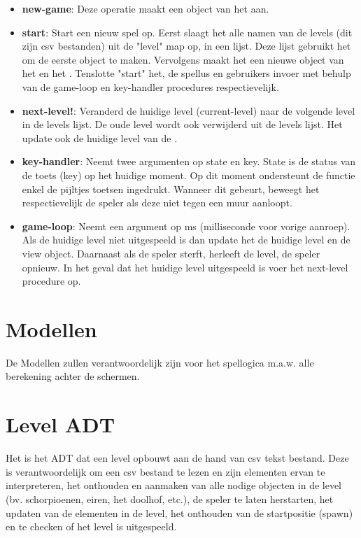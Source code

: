 \begin{itemize}
	\item \textbf{new-game}: Deze operatie maakt een object van het \texttt{} aan.
	\item \textbf{start}: Start een nieuw spel op.
		Eerst slaagt het alle namen van de levels (dit zijn csv bestanden) uit de "level" map op, in een lijst.
		Deze lijst gebruikt het om de eerste \texttt{} object te maken.
		Vervolgens maakt het een nieuwe object van het \texttt{} en het \texttt{}.
		Tenslotte "start" het, de spellus en gebruikers invoer met behulp van de game-loop en key-handler procedures respectievelijk. 
	\item \textbf{next-level!}: Veranderd de huidige level (current-level) naar de volgende level in de levels lijst.
		De oude level wordt ook verwijderd uit de levels lijst.
		Het update ook de huidige level van de \texttt{}.
	\item \textbf{key-handler}: Neemt twee argumenten op state en key.
		State is de status van de toets (key) op het huidige moment.
		Op dit moment ondersteunt de functie enkel de pijltjes toetsen ingedrukt.
		Wanneer dit gebeurt, beweegt het respectievelijk de speler als deze niet tegen een muur aanloopt.
	\item \textbf{game-loop}: Neemt een argument op ms (milliseconde voor vorige aanroep).
		Als de huidige level niet uitgespeeld is dan
		update het de huidige level en de view object.
		Daarnaast als de speler sterft, herleeft de level, de speler opnieuw.
		In het geval dat het huidige level uitgespeeld is voer het next-level procedure op.
\end{itemize}

\section{Modellen}
\label{model}
De Modellen zullen verantwoordelijk zijn voor het spellogica m.a.w. alle berekening achter de schermen.

\section{Level ADT}
\label{section:level}
Het \texttt{} is het ADT dat een level opbouwt aan de hand van csv tekst bestand.
Deze is verantwoordelijk om
een csv bestand te lezen en zijn elementen ervan te interpreteren,
het onthouden en aanmaken van alle nodige objecten in de level (bv. schorpioenen, eiren, het doolhof, etc.),
de speler te laten herstarten,
het updaten van de elementen in de level,
het onthouden van de startpositie (spawn)
en te checken of het level is uitgespeeld.

